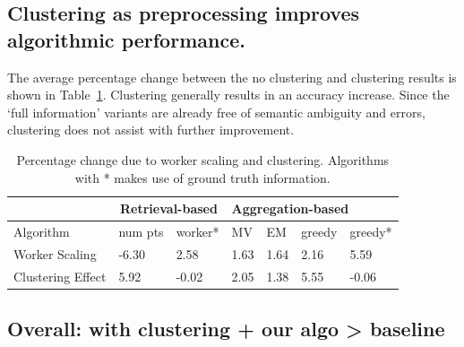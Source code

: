 \subsection{Clustering as preprocessing improves algorithmic performance.}
\par \noindent The average percentage change between the no clustering and clustering results is shown in Table~\ref{statsTable}. Clustering generally results in an accuracy increase. Since the `full information' variants are already free of semantic ambiguity and errors, clustering does not assist with further improvement. %
\begin{table}[h!]
   \small
      \begin{tabular}{l|l|l|l|l|l|l}
         & \multicolumn{2}{c|}{Retrieval-based} & \multicolumn{4}{l}{Aggregation-based} \\ \hline
      Algorithm         & num pts         & worker*        & MV    & EM    & greedy  & greedy*  \\ \hline
      Worker Scaling    & -6.30           & 2.58               & 1.63  & 1.64  & 2.16    & 5.59         \\ \hline
      Clustering Effect & 5.92            & -0.02              & 2.05  & 1.38  & 5.55    & -0.06       
      \end{tabular}
      \vspace{10pt}
      \caption{Percentage change due to worker scaling and clustering. Algorithms with * makes use of ground truth information.}
      \label{statsTable}
\end{table}

\subsection{Overall: with clustering + our algo > baseline}